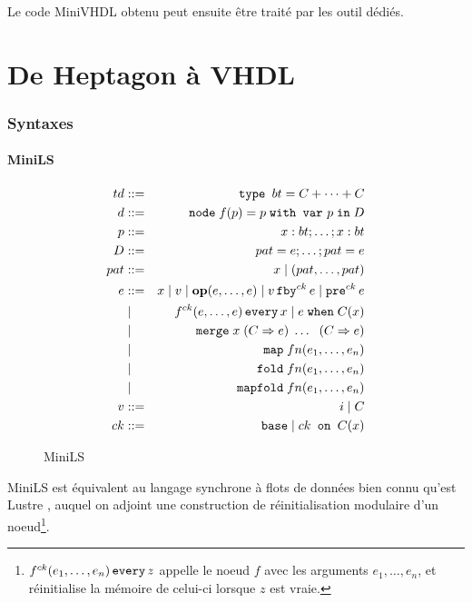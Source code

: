 \documentclass[a4paper]{article}
\newcommand{\TODO}[1]{}
\newcommand{\LANG}{Heptagon}
\newcommand{\p}[0]{\; \vert \;}
\newcommand{\mybox}[1]{\mbox{\tt{#1}}}
\newcommand{\Coloneqq}[0]{::=}
\newcommand{\Node}[4]{\mybox{node} \; f(#1) = #2 \; \mybox{with var} \
  #3 \; \mybox{in} \; #4}
\newcommand{\Op}[2]{\mybox{\bf{op}}(#1,\dots,#2)}
\newcommand{\Fby}[2]{#1 \, \mybox{fby}^{ck} \, #2}
\newcommand{\Pre}[1]{\mybox{pre}^{ck} \, #1}
\newcommand{\Every}[4]{#1^{ck}(#2,\dots,#3) \, \mybox{every} \, #4}
\newcommand{\When}[3]{#1 \; \mybox{when} \; #2(#3)}
\newcommand{\Merge}[5]{\mybox{merge} \; #1 \; (#2 \Rightarrow #3) \; \dots \; \
  (#4 \Rightarrow #5)}
\newcommand{\Base}[0]{\mybox{base}}
\newcommand{\On}[3]{#1 \mybox{ on } #2 (#3)}
\newcommand{\Map}[3]{\mathtt{map} \; #1 n (#2,\dots,#3)}
\newcommand{\Fold}[3]{\mathtt{fold} \; #1 n (#2,\dots,#3)}
\newcommand{\Mapfold}[3]{\mathtt{mapfold} \; #1 n (#2,\dots,#3)}
\begin{document}
Le code MiniVHDL obtenu peut ensuite \^etre trait\'e par les outil d\'edi\'es.

\section{De \LANG{} \`a VHDL}

\subsubsection{Syntaxes}

\TODO{Donner la forme originale sans reset telle qu'avant normalisation ?}

\paragraph{MiniLS}
\label{sec:syn:mls}

\begin{figure}[h]
  \centering
  \begin{eqnarray*}
    td & \Coloneqq & \mybox{type } bt = C + \dots + C \\
    d & \Coloneqq & \Node{p}{p}{p}{D} \\
    p & \Coloneqq & x : bt; \dots; x : bt \\
    D & \Coloneqq & pat = e; \dots; pat = e \\
    pat & \Coloneqq & x \p (pat,\dots,pat) \\
    e & \Coloneqq & x \p v \p \Op{e}{e} \p \Fby{v}{e} \p \Pre{e} \\
    & \p & \Every{f}{e}{e}{x} \p \When{e}{C}{x} \\
    & \p & \Merge{x}{C}{e}{C}{e} \\
    & \p & \Map{f}{e_1}{e_n} \\
    & \p & \Fold{f}{e_1}{e_n} \\
    & \p & \Mapfold{f}{e_1}{e_n} \\
    v & \Coloneqq & i \p C \\
    ck & \Coloneqq & \Base \p \On{ck}{C}{x}
  \end{eqnarray*}
  \caption{MiniLS}
  \label{fig:mls}
\end{figure}

MiniLS est \'equivalent au langage synchrone \`a flots de donn\'ees bien connu qu'est
Lustre \cite{lustre}, auquel on adjoint une construction de r\'einitialisation
modulaire d'un noeud\footnote{$\Every{f}{e_1}{e_n}{z}$ appelle le noeud $f$ avec
  les arguments $e_1,\dots,e_n$, et r\'einitialise la m\'emoire de celui-ci lorsque
  $z$ est vraie.}.
\end{document}

